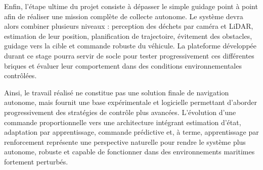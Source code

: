 \documentclass{rapportEILCO}
\begin{document}
	Enfin, l'étape ultime du projet consiste à dépasser le simple guidage point à point afin de réaliser une mission complète de collecte autonome. Le système devra alors combiner plusieurs niveaux : perception des déchets par caméra et LiDAR, estimation de leur position, planification de trajectoire, évitement des obstacles, guidage vers la cible et commande robuste du véhicule. La plateforme développée durant ce stage pourra servir de socle pour tester progressivement ces différentes briques et évaluer leur comportement dans des conditions environnementales contrôlées.
	
	Ainsi, le travail réalisé ne constitue pas une solution finale de navigation autonome, mais fournit une base expérimentale et logicielle permettant d'aborder progressivement des stratégies de contrôle plus avancées. L'évolution d'une commande proportionnelle vers une architecture intégrant estimation d'état, adaptation par apprentissage, commande prédictive et, à terme, apprentissage par renforcement représente une perspective naturelle pour rendre le système plus autonome, robuste et capable de fonctionner dans des environnements maritimes fortement perturbés.
	
\end{document}
